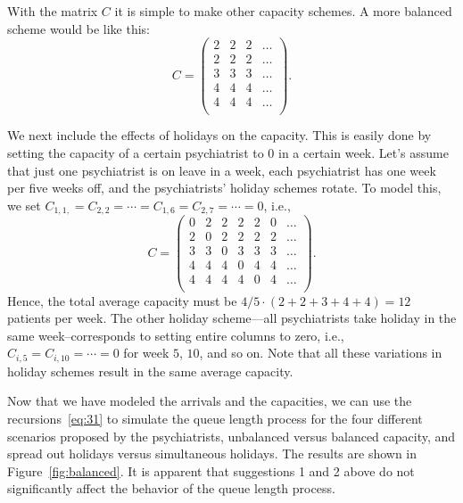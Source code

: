 With the matrix $C$ it is simple to make other capacity schemes. A
more balanced scheme would be like this:
\begin{equation*}
C = 
  \begin{pmatrix}
    2 & 2 & 2 & \ldots\\
    2 & 2 & 2 & \ldots\\
    3 & 3 & 3 & \ldots\\
    4 & 4 & 4 & \ldots\\
    4 & 4 & 4 & \ldots\\
  \end{pmatrix}.
\end{equation*}

We next include the effects of holidays on the capacity. This is
easily done by setting the capacity of a certain psychiatrist to 0 in
a certain week. Let's assume that just one psychiatrist is on leave in
a week, each psychiatrist has one week per five weeks off, and the
psychiatrists' holiday schemes rotate. To model this, we set
$C_{1,1,}=C_{2,2}=\cdots=C_{1,6}=C_{2,7} =\cdots = 0$, i.e.,
\begin{equation*}
C = 
  \begin{pmatrix}
    0 & 2 & 2 & 2 & 2 & 0 & \ldots \\
    2 & 0 & 2 & 2 & 2 & 2 & \ldots\\
    3 & 3 & 0 & 3 & 3 & 3 & \ldots\\
    4 & 4 & 4 & 0 & 4 & 4 & \ldots\\
    4 & 4 & 4 & 4 & 0 & 4 & \ldots\\
  \end{pmatrix}.
\end{equation*}
Hence, the total average capacity must be $4/5 \cdot (2+2+3+4+4) = 12$
patients per week.  The other holiday scheme---all psychiatrists take
holiday in the same week--corresponds to setting entire columns to
zero, i.e., $C_{i,5}=C_{i,10}=\cdots=0$ for week $5$, $10$, and so
on. Note that all these variations in holiday schemes result in the
same average capacity.

Now that we have modeled the arrivals and the capacities, we can use
the recursions~\eqref{eq:31} to simulate the queue length process for
the four different scenarios proposed by the psychiatrists, unbalanced
versus balanced capacity, and spread out holidays versus simultaneous
holidays.  The results are shown in Figure~\ref{fig:balanced}. It is
apparent that suggestions 1 and 2 above do not significantly affect
the behavior of the queue length process.  



